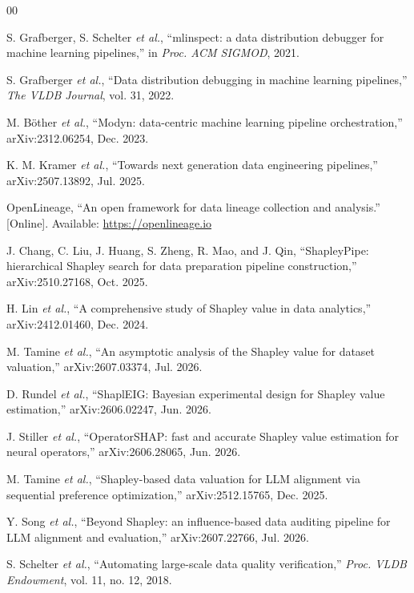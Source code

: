 \documentclass[conference]{IEEEtran}
\begin{document}
\begin{thebibliography}{00}

 S. Grafberger, S. Schelter \emph{et al.}, ``mlinspect: a data distribution debugger for machine learning pipelines,'' in \emph{Proc. ACM SIGMOD}, 2021.

 S. Grafberger \emph{et al.}, ``Data distribution debugging in machine learning pipelines,'' \emph{The VLDB Journal}, vol. 31, 2022.

 M. B\"other \emph{et al.}, ``Modyn: data-centric machine learning pipeline orchestration,'' arXiv:2312.06254, Dec. 2023.

 K. M. Kramer \emph{et al.}, ``Towards next generation data engineering pipelines,'' arXiv:2507.13892, Jul. 2025.

 OpenLineage, ``An open framework for data lineage collection and analysis.'' [Online]. Available: \url{https://openlineage.io}

 J. Chang, C. Liu, J. Huang, S. Zheng, R. Mao, and J. Qin, ``ShapleyPipe: hierarchical Shapley search for data preparation pipeline construction,'' arXiv:2510.27168, Oct. 2025.

 H. Lin \emph{et al.}, ``A comprehensive study of Shapley value in data analytics,'' arXiv:2412.01460, Dec. 2024.

 M. Tamine \emph{et al.}, ``An asymptotic analysis of the Shapley value for dataset valuation,'' arXiv:2607.03374, Jul. 2026.

 D. Rundel \emph{et al.}, ``ShaplEIG: Bayesian experimental design for Shapley value estimation,'' arXiv:2606.02247, Jun. 2026.

 J. Stiller \emph{et al.}, ``OperatorSHAP: fast and accurate Shapley value estimation for neural operators,'' arXiv:2606.28065, Jun. 2026.

 M. Tamine \emph{et al.}, ``Shapley-based data valuation for LLM alignment via sequential preference optimization,'' arXiv:2512.15765, Dec. 2025.

 Y. Song \emph{et al.}, ``Beyond Shapley: an influence-based data auditing pipeline for LLM alignment and evaluation,'' arXiv:2607.22766, Jul. 2026.

 S. Schelter \emph{et al.}, ``Automating large-scale data quality verification,'' \emph{Proc. VLDB Endowment}, vol. 11, no. 12, 2018.


\end{thebibliography}
\end{document}
